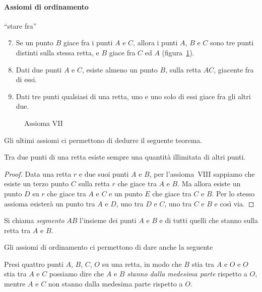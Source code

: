 \paragraph{Assiomi di ordinamento} ``stare fra''
\begin{enumerate}[label=\Roman{*}.]
\setcounter{enumi}{6}
\item Se un punto $B$ giace fra i punti $A$ e $C$, allora i punti $A$, $B$ e $C$ sono tre punti distinti sulla stessa retta, e $B$ giace fra $C$ ed $A$ (figura~\ref{fig:1.6}).
\item Dati due punti $A$ e $C$, esiste almeno un punto $B$, sulla retta $AC$, giacente fra di essi.
\item Dati tre punti qualsiasi di una retta, uno e uno solo di essi giace fra gli altri due.
\end{enumerate}

\begin{figure}[htb]
 \centering
 
 \caption{Assioma VII}\label{fig:1.6}
\end{figure}

Gli ultimi assiomi ci permettono di dedurre il seguente teorema.
\begin{teorema}
Tra due punti di una retta esiste sempre una quantità illimitata di altri punti.
\end{teorema}
\begin{proof}
Data una retta $r$ e due suoi punti $A$ e $B$, per l'assioma~VIII sappiamo che esiste un terzo punto $C$ sulla retta $r$ che giace tra $A$ e $B$. Ma allora esiste un punto $D$ su $r$ che giace tra $A$ e $C$ e un punto $E$ che giace tra $C$ e $B$. Per lo stesso assioma esisterà un punto tra $A$ e $D$, uno tra $D$ e $C$, uno tra $C$ e $B$ e così via.
\end{proof}
\begin{center}

\end{center}
\begin{definizione}
Si chiama \emph{segmento} $AB$ l'insieme dei punti $A$ e $B$ e di tutti quelli che stanno sulla retta tra $A$ e $B$.
\end{definizione}
Gli assiomi di ordinamento ci permettono di dare anche la seguente

\begin{definizione}
Presi quattro punti $A$, $B$, $C$, $O$ su una retta, in modo che $B$ stia tra $A$ e $O$ e $O$ stia tra $A$ e $C$ possiamo dire che $A$ e $B$ \emph{stanno dalla medesima parte} rispetto a $O$, mentre $A$ e $C$ non stanno dalla medesima parte rispetto a $O$.
\end{definizione}
\begin{center}

\end{center}


